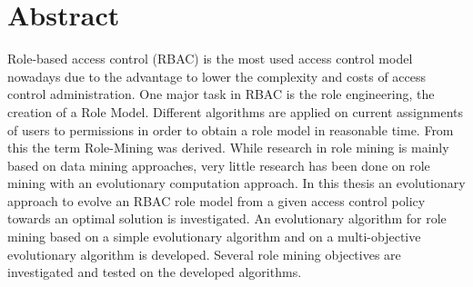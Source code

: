 \newpage
\chapter*{Abstract}
\iffalse
\begin{itemize}
    \item \hl{Summary: 1 page presenting the research problem, the main results, conclusion and how the thesis advances the field}
    \item \hl{one page stating what the thesis is about}
    \item \hl{highlight the contributions of the thesis}
\end{itemize} \fi
Role-based access control (RBAC) is the most used access control model nowadays due to the advantage to lower the complexity and costs of access control administration. One major task in RBAC is the role engineering, the creation of a Role Model. Different algorithms are applied on current assignments of users to permissions in order to obtain a role model in reasonable time. From this the term Role-Mining was derived. While research in role mining is mainly based on data mining approaches, very little research has been done on role mining with an evolutionary computation approach. In this thesis an evolutionary approach to evolve an RBAC role model from a given access control policy towards an optimal solution is investigated. An evolutionary algorithm for role mining based on a simple evolutionary algorithm and on a multi-objective evolutionary algorithm is developed. Several role mining objectives are investigated and tested on the developed algorithms.


